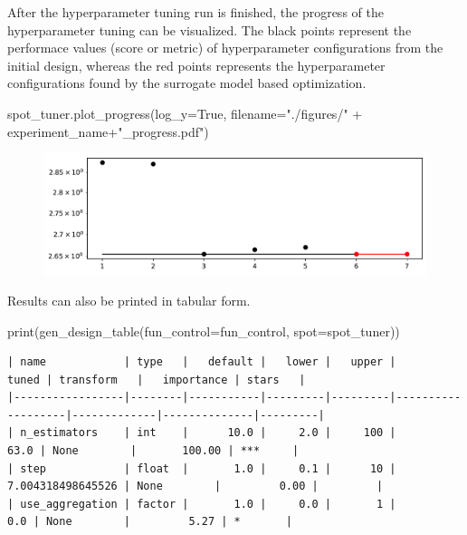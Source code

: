 \documentclass[
  letterpaper,
  DIV=11,
  numbers=noendperiod]{scrreprt}
\newenvironment{Shaded}{\begin{snugshade}}{\end{snugshade}}
\newcommand{\BuiltInTok}[1]{\textcolor[rgb]{0.00,0.23,0.31}{#1}}
\newcommand{\NormalTok}[1]{\textcolor[rgb]{0.00,0.23,0.31}{#1}}
\newcommand{\OperatorTok}[1]{\textcolor[rgb]{0.37,0.37,0.37}{#1}}
\newcommand{\StringTok}[1]{\textcolor[rgb]{0.13,0.47,0.30}{#1}}
\newcommand{\VariableTok}[1]{\textcolor[rgb]{0.07,0.07,0.07}{#1}}
\begin{document}
After the hyperparameter tuning run is finished, the progress of the
hyperparameter tuning can be visualized. The black points represent the
performace values (score or metric) of hyperparameter configurations
from the initial design, whereas the red points represents the
hyperparameter configurations found by the surrogate model based
optimization.

\begin{Shaded}
\begin{Highlighting}[]
\NormalTok{spot\_tuner.plot\_progress(log\_y}\OperatorTok{=}\VariableTok{True}\NormalTok{, filename}\OperatorTok{=}\StringTok{"./figures/"} \OperatorTok{+}\NormalTok{ experiment\_name}\OperatorTok{+}\StringTok{"\_progress.pdf"}\NormalTok{)}
\end{Highlighting}
\end{Shaded}

\begin{figure}[H]

{\centering \includegraphics{025_spot_hpt_river_friedman_amfr_files/figure-pdf/cell-21-output-1.pdf}

}

\end{figure}

Results can also be printed in tabular form.

\begin{Shaded}
\begin{Highlighting}[]
\BuiltInTok{print}\NormalTok{(gen\_design\_table(fun\_control}\OperatorTok{=}\NormalTok{fun\_control, spot}\OperatorTok{=}\NormalTok{spot\_tuner))}
\end{Highlighting}
\end{Shaded}

\begin{verbatim}
| name            | type   |   default |   lower |   upper |             tuned | transform   |   importance | stars   |
|-----------------|--------|-----------|---------|---------|-------------------|-------------|--------------|---------|
| n_estimators    | int    |      10.0 |     2.0 |     100 |              63.0 | None        |       100.00 | ***     |
| step            | float  |       1.0 |     0.1 |      10 | 7.004318498645526 | None        |         0.00 |         |
| use_aggregation | factor |       1.0 |     0.0 |       1 |               0.0 | None        |         5.27 | *       |
\end{verbatim}
\end{document}
